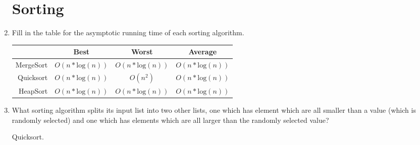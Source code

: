 \documentclass[11pt]{article}
\newenvironment{answer}{\large\lstset{basicstyle=\large}\color{white}}{}
\newenvironment{answer}{\large\lstset{basicstyle=\large}\color{red}}{}
\begin{document}
\begin{enumerate}
\section*{Sorting}

\item Fill in the table for the asymptotic running time of each sorting
      algorithm.
      \begin{center}
      \begin{tabular}{|r|c|c|c|}
        \hline
        ~ & Best & Worst & Average \\\hline
        MergeSort &
            \begin{answer}$O(n*\textrm{log}(n))$\end{answer} &
            \begin{answer}$O(n*\textrm{log}(n))$\end{answer} &
            \begin{answer}$O(n*\textrm{log}(n))$\end{answer} \\\hline
        Quicksort &
            \begin{answer}$O(n*\textrm{log}(n))$\end{answer} &
            \begin{answer}$O(n^2)$\end{answer} &
            \begin{answer}$O(n*\textrm{log}(n))$\end{answer} \\\hline
        HeapSort &
            \begin{answer}$O(n*\textrm{log}(n))$\end{answer} &
            \begin{answer}$O(n*\textrm{log}(n))$\end{answer} &
            \begin{answer}$O(n*\textrm{log}(n))$\end{answer} \\\hline
      \end{tabular}
      \end{center}

\item What sorting algorithm splits its input list into two other lists, one
      which has element which are all smaller than a value (which is randomly
      selected) and one which has elements which are all larger than the
      randomly selected value?

    \begin{answer}
    Quicksort.
    \end{answer}


\end{enumerate}
\end{document}
